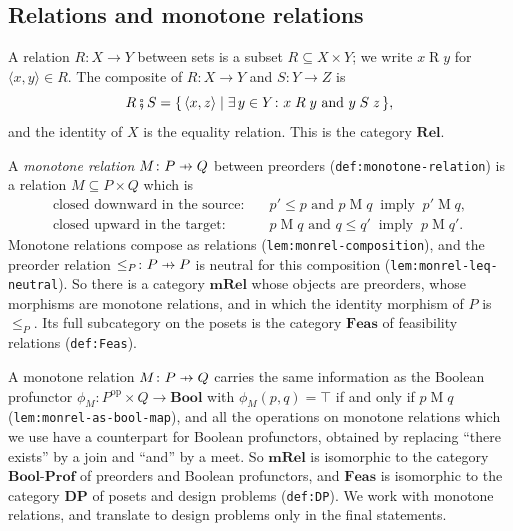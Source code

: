 \documentclass[11pt,a4paper]{article}
\theoremstyle{plain}
\theoremstyle{definition}
\theoremstyle{remark}
\newcommand{\Cat}[1]{\mathbf{#1}}
\newcommand{\Rel}{\Cat{Rel}}
\newcommand{\mRel}{\Cat{mRel}}
\newcommand{\Feas}{\Cat{Feas}}
\newcommand{\DP}{\Cat{DP}}
\newcommand{\BoolProf}{\Cat{Bool}\text{-}\Cat{Prof}}
\newcommand{\Bool}{\Cat{Bool}}
\newcommand{\then}{\mathbin{\fatsemi}}
\newcommand{\tup}[1]{\langle #1 \rangle}
\newcommand{\profto}{\mathrel{\ooalign{\hfil$\mapstochar\mkern 5mu$\hfil\cr$\to$\cr}}}
\newcommand{\rel}[3]{#1 \mathrel{#2} #3}
\newcommand{\op}{^{\mathrm{op}}}
\newcommand{\lbl}[1]{\nolinkurl{#1}}
\begin{document}
\subsection{Relations and monotone relations}

A relation $R \colon X \to Y$ between sets is a subset $R \subseteq X \times Y$; we write $\rel{x}{R}{y}$ for $\tup{x,y} \in R$.
The composite of $R \colon X \to Y$ and $S \colon Y \to Z$ is
\begin{equation}
    \label{eq:rel-composition}
    R \then S = \{\, \tup{x,z} \mid \exists\, y \in Y \colon \rel{x}{R}{y} \text{ and } \rel{y}{S}{z} \,\},
\end{equation}
and the identity of $X$ is the equality relation.
This is the category $\Rel$.

A \emph{monotone relation} $M \colon P \profto Q$ between preorders (\lbl{def:monotone-relation}) is a relation $M \subseteq P \times Q$ which is
\begin{align}
    \label{eq:closed-source}
    \text{closed downward in the source:} & \quad p' \leq p \text{ and } \rel{p}{M}{q} \ \text{ imply }\ \rel{p'}{M}{q}, \\
    \label{eq:closed-target}
    \text{closed upward in the target:}   & \quad \rel{p}{M}{q} \text{ and } q \leq q' \ \text{ imply }\ \rel{p}{M}{q'}.
\end{align}
Monotone relations compose as relations (\lbl{lem:monrel-composition}), and the preorder relation $\leq_P \colon P \profto P$ is neutral for this composition (\lbl{lem:monrel-leq-neutral}).
So there is a category $\mRel$ whose objects are preorders, whose morphisms are monotone relations, and in which the identity morphism of $P$ is $\leq_P$.
Its full subcategory on the posets is the category $\Feas$ of feasibility relations (\lbl{def:Feas}).

A monotone relation $M \colon P \profto Q$ carries the same information as the Boolean profunctor $\phi_M \colon P\op \times Q \to \Bool$ with $\phi_M(p, q) = \top$ if and only if $\rel{p}{M}{q}$ (\lbl{lem:monrel-as-bool-map}), and all the operations on monotone relations which we use have a counterpart for Boolean profunctors, obtained by replacing ``there exists'' by a join and ``and'' by a meet.
So $\mRel$ is isomorphic to the category $\BoolProf$ of preorders and Boolean profunctors, and $\Feas$ is isomorphic to the category $\DP$ of posets and design problems (\lbl{def:DP}).
We work with monotone relations, and translate to design problems only in the final statements.
\end{document}
